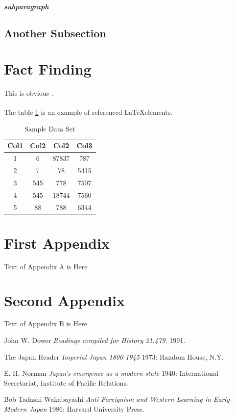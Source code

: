 \documentclass{article}
\begin{document}
        \subparagraph{subparagraph}
        \blindtext
        
        \subsection{Another Subsection}
    		\blindtext

%
%    
    \newpage
    	\section{Fact Finding}
    	\paragraph{}
	This is obvious \cite{norman}.
	
	\paragraph{}
	The table \ref{table:1} is an example of referenced \LaTeX elements.
 
	\begin{table}[ht]
	\centering
	\begin{tabular}{||c c c c||} 
	\hline
	Col1 & Col2 & Col2 & Col3 \\ [0.5ex] 
	\hline\hline
	1 & 6 & 87837 & 787 \\ 
	2 & 7 & 78 & 5415 \\
	3 & 545 & 778 & 7507 \\
	4 & 545 & 18744 & 7560 \\
	5 & 88 & 788 & 6344 \\ [1ex] 
	\hline
	\end{tabular}
	\caption{Sample Data Set}
	\label{table:1}
	\end{table}

    	\newpage
    	\appendix
    	\section{First Appendix}
	Text of Appendix A is Here
	
	\section{Second Appendix}
	Text of Appendix B is Here

	\newpage
	\begin{thebibliography}{1}
	 John W. Dower {\em Readings compiled for History 21.479.}  1991.

    The Japan Reader {\em Imperial Japan 1800-1945} 1973: Random House, N.Y.

   E. H. Norman {\em Japan's emergence as a modern state} 1940: International Secretariat, Institute of Pacific Relations.

   Bob Tadashi Wakabayashi {\em Anti-Foreignism and Western Learning in Early-Modern Japan} 1986: Harvard University Press.

  \end{thebibliography}
  
\end{document}
